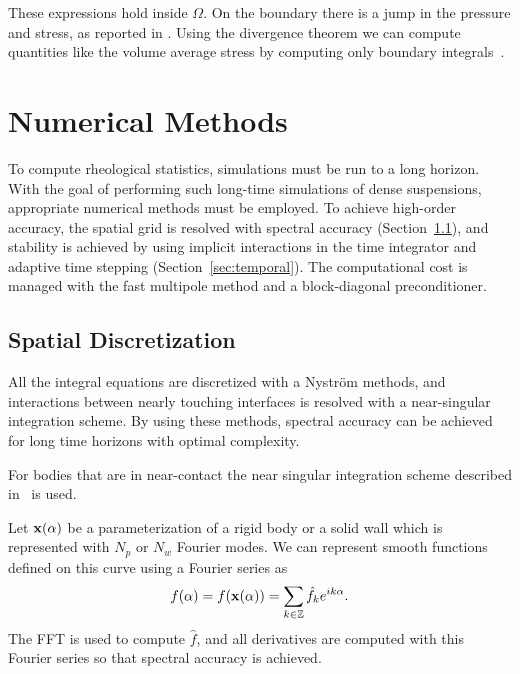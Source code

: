 \documentclass[preprint, 10pt]{elsarticle}
\begin{document}
These expressions hold inside $\Omega$. On the boundary there is a jump in the pressure and stress, as reported in \cite{Quaife2014}.
Using the divergence theorem we can compute quantities like the volume average stress by computing only boundary integrals~\cite{Pozrikidis1992}. 
		
\section{Numerical Methods\label{s:method}} 

To compute rheological statistics, simulations must be run to a long horizon. With the goal of performing such long-time simulations of dense
suspensions, appropriate numerical methods must be employed.  To achieve
high-order accuracy, the spatial grid is resolved with spectral accuracy
(Section~\ref{sec:spatial}), and stability is achieved by using implicit
interactions in the time integrator and adaptive time stepping (Section~\ref{sec:temporal}). The computational cost is managed
with the fast multipole method
\cite{Greenbaum1992} and a
block-diagonal preconditioner.


\subsection{Spatial Discretization}\label{sec:spatial}

All the integral equations are discretized
with a Nystr\"om  methods, and interactions between nearly touching
interfaces is resolved with a near-singular integration scheme. By using
these methods, spectral accuracy can be achieved for long time horizons
with optimal complexity.

For bodies that are in near-contact the near singular
integration scheme described in~\cite{Quaife2014, Ying2006} is used.

Let ${\mathbf{x}}(\alpha)$ be a parameterization of a rigid body or a solid
wall which is represented with $N_p$ or $N_w$ Fourier modes. We can represent
smooth functions defined on this curve using a
Fourier series as
\begin{align}
  f(\alpha) = f({\mathbf{x}}(\alpha)) = \sum_{k \in {\mathbb{Z}}} \hat{f}_k e^{ik\alpha}.
\end{align}
The FFT is used to compute $\hat{f}$, and all derivatives are computed
with this Fourier series so that spectral accuracy is achieved.
\end{document}

